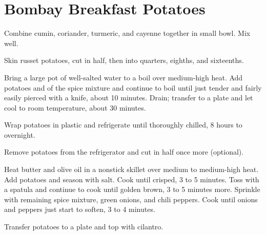 \section{Bombay Breakfast Potatoes}
\begin{recipe}
	
	
	
	
	
	
	Combine cumin, coriander, turmeric, and cayenne together in small bowl. Mix well.
	
	Skin russet potatoes, cut in half, then into quarters, eighths, and sixteenths.
	
	Bring a large pot of well-salted water to a boil over medium-high heat. Add potatoes and  of the spice mixture and continue to boil until just tender and fairly easily pierced with a knife, about 10 minutes. Drain; transfer to a plate and let cool to room temperature, about 30 minutes.
	
	Wrap potatoes in plastic and refrigerate until thoroughly chilled, 8 hours to overnight.
	
	Remove potatoes from the refrigerator and cut in half once more (optional).
	
	Heat butter and olive oil in a nonstick skillet over medium to medium-high heat. Add potatoes and season with salt. Cook until crisped, 3 to 5 minutes. Toss with a spatula and continue to cook until golden brown, 3 to 5 minutes more. Sprinkle with remaining spice mixture, green onions, and chili peppers. Cook until onions and peppers just start to soften, 3 to 4 minutes.
	
	Transfer potatoes to a plate and top with cilantro.
		
\end{recipe}
